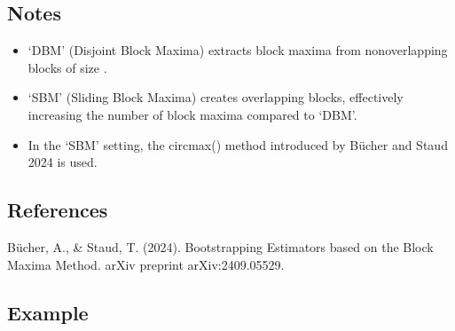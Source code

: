 \documentclass[a4paper,11pt,openany,english]{sphinxmanual}
\begin{document}
\begin{fulllineitems}
\begin{description}
\end{description}


\subsection{Notes}
\label{\detokenize{api_bootstrap:id9}}\begin{itemize}
\item {} 
\sphinxAtStartPar
‘DBM’ (Disjoint Block Maxima) extracts block maxima from non\sphinxhyphen{}overlapping blocks of size .

\item {} 
\sphinxAtStartPar
‘SBM’ (Sliding Block Maxima) creates overlapping blocks, effectively increasing the number of block maxima compared to ‘DBM’.

\item {} 
\sphinxAtStartPar
In the ‘SBM’ setting, the circmax() method introduced by Bücher and Staud 2024 is used.

\end{itemize}


\subsection{References}
\label{\detokenize{api_bootstrap:references}}
\sphinxAtStartPar
Bücher, A., \& Staud, T. (2024). Bootstrapping Estimators based on the Block Maxima Method. 
arXiv preprint arXiv:2409.05529.


\subsection{Example}
\label{\detokenize{api_bootstrap:id10}}
\begin{sphinxVerbatim}[commandchars=\\\{\}]
  \PYG{p}{[}         \PYG{p}{]}
  
\end{sphinxVerbatim}

\begin{sphinxVerbatim}[commandchars=\\\{\}]
  
\PYG{g+go}{array([[3, 6, 9],}
\PYG{g+go}{       [4, 7, 10]])}
\end{sphinxVerbatim}

\end{fulllineitems}
\end{document}
